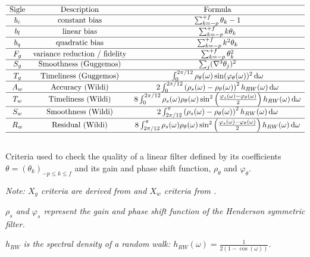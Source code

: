 \documentclass[
  12pt,
  ,
  a4paper]{article}
\newcommand\1{\mathds{1}}
\newcommand\ud{\,\mathrm{d}}
\begin{document}
\begin{table}[!ht]
$$\begin{array}{ccc}
\hline \text{Sigle} & \text{Description} & \text{Formula}\\
\hline b_{c} & \text{constant bias} & \sum_{k=-p}^{+f}\theta_{k}-1\\
\hline b_{l} & \text{linear bias} & \sum_{k=-p}^{+f}k\theta_{k}\\
\hline b_{q} & \text{quadratic bias} & \sum_{k=-p}^{+f}k^{2}\theta_{k}\\
\hline F_{g} & \text{variance reduction / fidelity} & \sum_{k=-p}^{+f}\theta_{k}^{2}\\
\hline S_{g} & \text{Smoothness (Guggemos)} & \sum_{j}(\nabla^{3}\theta_{j})^{2}\\
\hline T_{g} & \text{Timeliness (Guggemos)} & \int_{0}^{2\pi/12}\rho_{\theta}(\omega)\sin(\varphi_{\theta}(\omega))^{2}\ud\omega\\
\hline A_{w} & \text{Accuracy (Wildi)} & 2\int_0^{2\pi/12}\left(\rho_{s}(\omega)-\rho_{\theta}(\omega)\right)^{2}h_{RW}(\omega)\ud\omega\\
\hline T_{w} & \text{Timeliness (Wildi)} & 8\int_0^{2\pi/12} \rho_{s}(\omega)\rho_{\theta}(\omega)\sin^{2}\left(\frac{\varphi_s(\omega)-\varphi_\theta(\omega)}{2}\right)h_{RW}(\omega)\ud\omega\\
\hline S_{w} & \text{Smoothness (Wildi)} & 2\int_{2\pi/12}^{\pi}\left(\rho_{s}(\omega)-\rho_{\theta}(\omega)\right)^{2}h_{RW}(\omega)\ud\omega\\
\hline R_{w} & \text{Residual (Wildi)} & 8\int_{2\pi/12}^{\pi} \rho_{s}(\omega)\rho_{\theta}(\omega)\sin^{2}\left(\frac{\varphi_s(\omega)-\varphi_\theta(\omega)}{2}\right)h_{RW}(\omega)\ud\omega\\
\hline \\
\end{array} $$
\caption{Criteria used to check the quality of a linear filter defined by its coefficients $\theta=(\theta_k)_{-p\leq k\leq f}$ and its gain and phase shift function, $\rho_{\theta}$ and $\varphi_\theta$.} 
\label{tab:QC}
\footnotesize
\emph{Note: $X_g$ criteria are derived from \textcite{ch15HBSA} and $X_w$ criteria from \textcite{trilemmaWMR2019}.}

\emph{$\rho_s$ and $\varphi_s$ represent the gain and phase shift function of the Henderson symmetric filter.}

\emph{$h_{RW}$ is the spectral density of a random walk: $h_{RW}(\omega)=\frac{1}{2(1-\cos(\omega))}$.}
\end{table}
\end{document}
